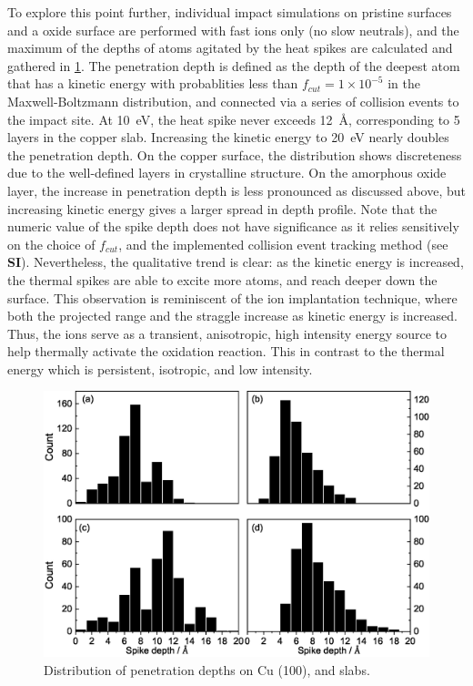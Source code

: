 \documentclass[manuscript=cmatex]{achemso}
\begin{document}
To explore this point further, individual impact simulations on pristine  surfaces and a oxide surface are performed with fast ions only (no slow neutrals), and the maximum of the depths of atoms agitated by the heat spikes are calculated and gathered in \cref{fig:spikes}. The penetration depth is defined as the depth of the deepest atom that has a kinetic energy with probablities less than $f_{cut}=1\times10^{-5}$ in the Maxwell-Boltzmann distribution, and connected via a series of collision events to the impact site. At \SI{10}{eV}, the heat spike never exceeds \SI{12}{\AA}, corresponding to 5 layers in the copper slab. Increasing the kinetic energy to \SI{20}{eV} nearly doubles the penetration depth. On the  copper surface, the distribution shows discreteness due to the well-defined layers in crystalline structure. On the amorphous oxide layer, the increase in penetration depth is less pronounced as discussed above, but increasing kinetic energy gives a larger spread in depth profile. Note that the numeric value of the spike depth does not have significance as it relies sensitively on the choice of $f_{cut}$, and the implemented collision event tracking method (see \textbf{SI}). Nevertheless, the qualitative trend is clear: as the kinetic energy is increased, the thermal spikes are able to excite more atoms, and reach deeper down the surface. This observation is reminiscent of the ion implantation technique, where both the projected range and the straggle increase as kinetic energy is increased. Thus, the ions serve as a transient, anisotropic, high intensity energy source to help thermally activate the oxidation reaction. This in contrast to the thermal energy which is persistent, isotropic, and low intensity. 

\begin{figure}[h]
  \centering
  \includegraphics[width=\textwidth]{spikes}
  \caption[Distribution of penetration depths on Cu]{Distribution of penetration depths on Cu (100), and  slabs.}
  \label{fig:spikes}
\end{figure}
\end{document}
